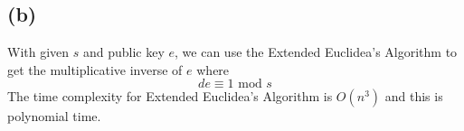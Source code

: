 \documentclass{article}
\begin{document}
\subsection*{(b)}
With given $s$ and public key $e$, we can use the Extended Euclidea's Algorithm to get the multiplicative inverse of $e$ where
$$de \equiv 1 \mbox{ mod } s$$
The time complexity for Extended Euclidea's Algorithm is $O(n^3)$ and this is polynomial time.
    
\end{document}
